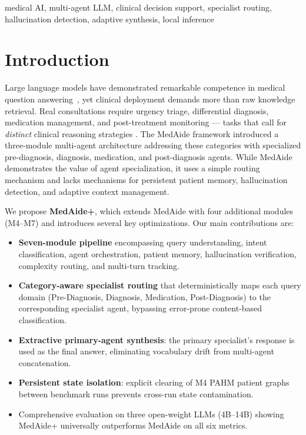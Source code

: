 \documentclass[conference]{IEEEtran}
\begin{document}
\begin{IEEEkeywords}
medical AI, multi-agent LLM, clinical decision support, specialist routing, 
hallucination detection, adaptive synthesis, local inference
\end{IEEEkeywords}

\section{Introduction}
\label{sec:intro}

Large language models have demonstrated remarkable competence in medical question
answering~\cite{singhal2023meditron,tian2023chimed,zhang2023huatuogpt}, yet clinical
deployment demands more than raw knowledge retrieval. Real consultations require urgency
triage, differential diagnosis, medication management, and post-treatment monitoring —
tasks that call for \emph{distinct} clinical reasoning strategies \cite{mediaide2024}.
The MedAide framework \cite{mediaide2024} introduced a three-module multi-agent
architecture addressing these categories with specialized pre-diagnosis, diagnosis,
medication, and post-diagnosis agents. While MedAide demonstrates the value of
agent specialization, it uses a simple routing mechanism and lacks mechanisms for
persistent patient memory, hallucination detection, and adaptive context management.

We propose \textbf{MedAide+}, which extends MedAide with four additional modules
(M4–M7) and introduces several key optimizations. Our main contributions are:

\begin{itemize}
  \item \textbf{Seven-module pipeline} encompassing query understanding, intent
    classification, agent orchestration, patient memory, hallucination verification,
    complexity routing, and multi-turn tracking.
  \item \textbf{Category-aware specialist routing} that deterministically maps each
    query domain (Pre-Diagnosis, Diagnosis, Medication, Post-Diagnosis) to the
    corresponding specialist agent, bypassing error-prone content-based classification.
  \item \textbf{Extractive primary-agent synthesis}: the primary specialist's response
    is used as the final answer, eliminating vocabulary drift from multi-agent
    concatenation.
  \item \textbf{Persistent state isolation}: explicit clearing of M4 PAHM patient
    graphs between benchmark runs prevents cross-run state contamination.
  \item Comprehensive evaluation on three open-weight LLMs (4B–14B) showing MedAide+ universally
    outperforms MedAide on all six metrics.
\end{itemize}
\end{document}
